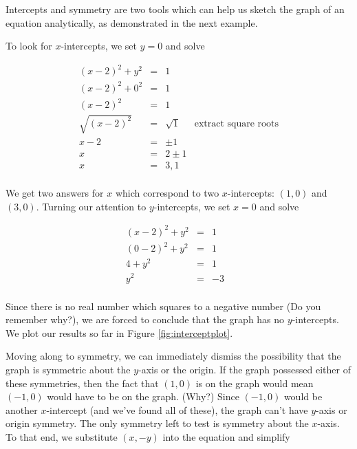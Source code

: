 \medskip

Intercepts and symmetry are two tools which can help us sketch the graph of an equation analytically, as demonstrated in the next example.

\medskip

{
To look for $x$-intercepts, we set $y=0$ and solve

\[ \begin{array}{rclr}   

(x-2)^2 + y^2 & = & 1 & \\ 
(x-2)^2 + 0^2 & = & 1 & \\ 
(x-2)^2 & = & 1 & \\
\sqrt{(x-2)^2} & = & \sqrt{1} & \mbox{extract square roots}\\
x - 2 & = & \pm 1 & \\
x  & = & 2 \pm 1 & \\
x  & = & 3, 1 & \\

\end{array} \]

We get two answers for $x$ which correspond to two $x$-intercepts:  $(1,0)$ and $(3,0)$.    Turning our attention to $y$-intercepts, we set $x=0$ and solve

\[ \begin{array}{rclr}   

(x-2)^2 + y^2 & = & 1 & \\ 
(0-2)^2 + y^2 & = & 1 & \\ 
4 + y^2 & = & 1 & \\
y^2 & = & -3 & \\

\end{array} \]

Since there is no real number which squares to a negative number (Do you remember why?), we are forced to conclude that the graph has no $y$-intercepts. We plot our results so far in Figure \ref{fig:interceptplot}.

\medskip


Moving along to symmetry, we can immediately dismiss the possibility that the graph is symmetric about the $y$-axis or the origin.  If the graph possessed either of these symmetries, then the fact that $(1,0)$ is on the graph would mean $(-1,0)$ would have to be on the graph. (Why?)  Since $(-1,0)$ would be another $x$-intercept (and we've found all of these), the graph can't have $y$-axis or origin symmetry.  The only symmetry left to test is symmetry about the $x$-axis.   To that end, we substitute $(x,-y)$ into the equation and simplify

}
